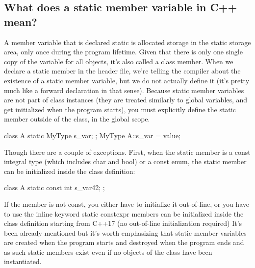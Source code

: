 \documentclass{report}
\begin{document}
\subsection{What does a static member variable in C++ mean?}
\bigbreak \noindent 
A member variable that is declared static is allocated storage in the static storage area, only once during the program lifetime. Given that there is only one single copy of the variable for all objects, it’s also called a class member.
\bigbreak \noindent 
When we declare a static member in the header file, we’re telling
the compiler about the existence of a static member variable,
but we do not actually define it (it’s pretty much like a forward
declaration in that sense). Because static member variables are not
part of class instances (they are treated similarly to global variables,
and get initialized when the program starts), you must explicitly
define the static member outside of the class, in the global scope.
\bigbreak \noindent 
\begin{cppcode}
class A {
    static MyType s_var;
};
MyType A::s_var = value;
\end{cppcode}
\bigbreak \noindent 
Though there are a couple of exceptions. First, when the static member is a const integral type (which includes char and bool) or a const enum, the static member can be initialized inside the class definition:
\bigbreak \noindent 
\begin{cppcode}
class A {
    static const int s_var{42};
};
\end{cppcode}
\bigbreak \noindent 
If the member is not const, you either have to initialize it out-of-line,
or you have to use the inline keyword
\bigbreak \noindent 
static constexpr members can be initialized inside the class definition starting from C++17 (no out-of-line initialization required)
\bigbreak \noindent 
It’s been already mentioned but it’s worth emphasizing that static
member variables are created when the program starts and destroyed when the program ends and as such static members exist
even if no objects of the class have been instantiated.


\bigbreak \noindent 
\end{document}
